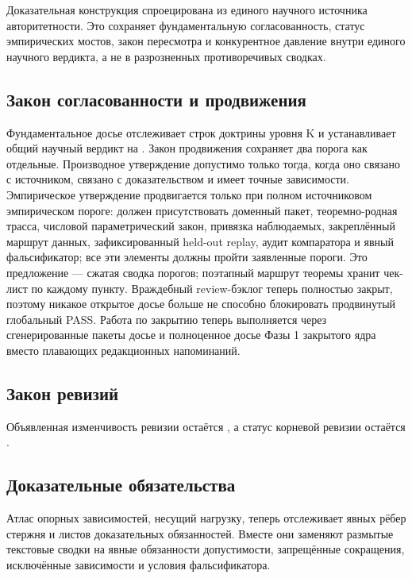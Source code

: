 Доказательная конструкция спроецирована из единого научного источника авторитетности. Это сохраняет фундаментальную согласованность, статус эмпирических мостов, закон пересмотра и конкурентное давление внутри единого научного вердикта, а не в разрозненных противоречивых сводках.

\subsection{Закон согласованности и продвижения}
Фундаментальное досье отслеживает  строк доктрины уровня K и устанавливает общий научный вердикт на .
Закон продвижения сохраняет два порога как отдельные. Производное утверждение допустимо только тогда, когда оно связано с источником, связано с доказательством и имеет точные зависимости. Эмпирическое утверждение продвигается только при полном источниковом эмпирическом пороге: должен присутствовать доменный пакет, теоремно-родная трасса, числовой параметрический закон, привязка наблюдаемых, закреплённый маршрут данных, зафиксированный held-out replay, аудит компаратора и явный фальсификатор; все эти элементы должны пройти заявленные пороги. Это предложение — сжатая сводка порогов; поэтапный маршрут теоремы хранит чек-лист по каждому пункту.
Враждебный review-бэклог теперь полностью закрыт, поэтому никакое открытое досье больше не способно блокировать продвинутый глобальный PASS.
Работа по закрытию теперь выполняется через сгенерированные пакеты досье и полноценное досье Фазы 1 закрытого ядра вместо плавающих редакционных напоминаний.

\subsection{Закон ревизий}
Объявленная изменчивость ревизии остаётся , а статус корневой ревизии остаётся .

\subsection{Доказательные обязательства}
Атлас опорных зависимостей, несущий нагрузку, теперь отслеживает  явных рёбер стержня и  листов доказательных обязанностей. Вместе они заменяют размытые текстовые сводки на явные обязанности допустимости, запрещённые сокращения, исключённые зависимости и условия фальсификатора.

